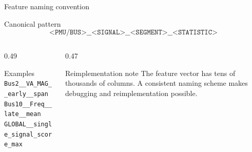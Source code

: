 \documentclass[aspectratio=169,10pt,t]{beamer}
\newcommand{\code}[1]{\texttt{\footnotesize #1}}
\begin{document}
%

\iffalse
\begin{frame}{Feature naming convention}
\small
\begin{block}{Canonical pattern}
\[
\texttt{<PMU/BUS>\_\_<SIGNAL>\_\_<SEGMENT>\_\_<STATISTIC>}
\]
\end{block}
\begin{columns}[T,totalwidth=\textwidth]
\begin{column}{0.49\textwidth}
\begin{exampleblock}{Examples}
\code{Bus2\_\_VA\_MAG\_\_early\_\_span}\\
\code{Bus10\_\_Freq\_\_late\_\_mean}\\
\code{GLOBAL\_\_single\_signal\_score\_max}
\end{exampleblock}
\end{column}
\begin{column}{0.47\textwidth}
\begin{alertblock}{Reimplementation note}
The feature vector has tens of thousands of columns. A consistent naming scheme makes debugging and reimplementation possible.
\end{alertblock}
\end{column}
\end{columns}
\end{frame}
\end{document}
